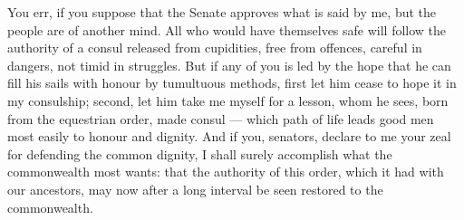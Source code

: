  You err, if you suppose that the Senate approves what is said by me, but the people are of another mind. All who would have themselves safe will follow the authority of a consul released from cupidities, free from offences, careful in dangers, not timid in struggles. But if any of you is led by the hope that he can fill his sails with honour by tumultuous methods, first let him cease to hope it in my consulship; second, let him take me myself for a lesson, whom he sees, born from the equestrian order, made consul --- which path of life leads good men most easily to honour and dignity. And if you, senators, declare to me your zeal for defending the common dignity, I shall surely accomplish what the commonwealth most wants: that the authority of this order, which it had with our ancestors, may now after a long interval be seen restored to the commonwealth.
